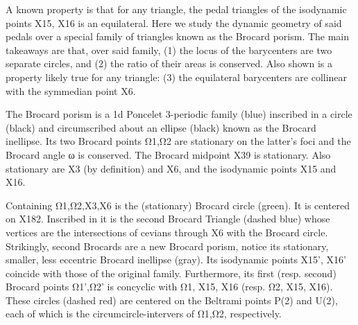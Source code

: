 A known property is that for any triangle, the pedal triangles of the isodynamic points X15, X16 is an equilateral. Here we study the dynamic geometry of said pedals over a special family of triangles known as the Brocard porism. The main takeaways are that, over said family, (1) the locus of the barycenters are two separate circles, and (2) the ratio of their areas is conserved. Also shown is a property likely true for any triangle: (3) the equilateral barycenters are collinear with the symmedian point X6.

The Brocard porism is a 1d Poncelet 3-periodic family (blue) inscribed in a circle (black) and circumscribed about an ellipse (black) known as the Brocard inellipse. Its two Brocard points Ω1,Ω2 are stationary on the latter's foci and the Brocard angle ω is conserved. The Brocard midpoint X39 is stationary. Also stationary are X3 (by definition) and X6, and the isodynamic points X15 and X16.

Containing Ω1,Ω2,X3,X6 is the (stationary) Brocard circle (green). It is centered on X182. Inscribed in it is the second Brocard Triangle (dashed blue) whose vertices are the intersections of cevians through X6 with the Brocard circle. Strikingly, second Brocards are a new Brocard porism, notice its stationary, smaller, less eccentric Brocard inellipse (gray). Its isodynamic points X15', X16' coincide with those of the original family. Furthermore, its first (resp. second) Brocard points Ω1',Ω2' is concyclic with Ω1, X15, X16 (resp. Ω2, X15, X16). These circles (dashed red) are centered on the Beltrami points P(2) and U(2), each of which is the circumcircle-intervers of Ω1,Ω2, respectively.